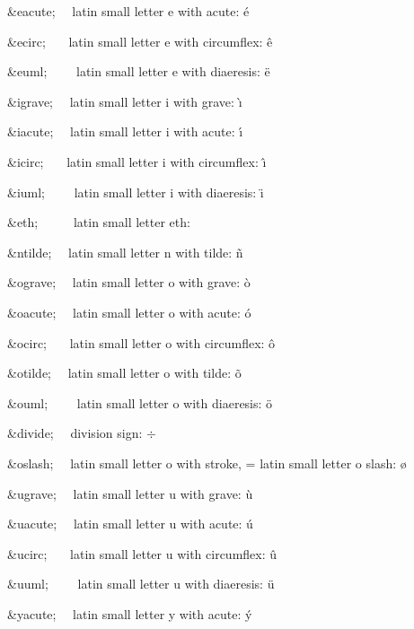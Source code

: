 \begin{DoxyItemize}
\item {\ttfamily \&eacute;}{\ttfamily ~~} latin small letter e with acute\+: \'{e} 
\item {\ttfamily \&ecirc;}{\ttfamily ~~~} latin small letter e with circumflex\+: \^{e} 
\item {\ttfamily \&euml;}{\ttfamily ~~~~} latin small letter e with diaeresis\+: \"{e} 
\item {\ttfamily \&igrave;}{\ttfamily ~~} latin small letter i with grave\+: \`{\i} 
\item {\ttfamily \&iacute;}{\ttfamily ~~} latin small letter i with acute\+: \'{\i} 
\item {\ttfamily \&icirc;}{\ttfamily ~~~} latin small letter i with circumflex\+: \^{\i} 
\item {\ttfamily \&iuml;}{\ttfamily ~~~~} latin small letter i with diaeresis\+: \"{\i} 
\item {\ttfamily \&eth;}{\ttfamily ~~~~~} latin small letter eth\+: \dh 
\item {\ttfamily \&ntilde;}{\ttfamily ~~} latin small letter n with tilde\+: \~{n} 
\item {\ttfamily \&ograve;}{\ttfamily ~~} latin small letter o with grave\+: \`{o} 
\item {\ttfamily \&oacute;}{\ttfamily ~~} latin small letter o with acute\+: \'{o} 
\item {\ttfamily \&ocirc;}{\ttfamily ~~~} latin small letter o with circumflex\+: \^{o} 
\item {\ttfamily \&otilde;}{\ttfamily ~~} latin small letter o with tilde\+: \~{o} 
\item {\ttfamily \&ouml;}{\ttfamily ~~~~} latin small letter o with diaeresis\+: \"{o} 
\item {\ttfamily \&divide;}{\ttfamily ~~} division sign\+: {$\div$} 
\item {\ttfamily \&oslash;}{\ttfamily ~~} latin small letter o with stroke, = latin small letter o slash\+: {\o} 
\item {\ttfamily \&ugrave;}{\ttfamily ~~} latin small letter u with grave\+: \`{u} 
\item {\ttfamily \&uacute;}{\ttfamily ~~} latin small letter u with acute\+: \'{u} 
\item {\ttfamily \&ucirc;}{\ttfamily ~~~} latin small letter u with circumflex\+: \^{u} 
\item {\ttfamily \&uuml;}{\ttfamily ~~~~} latin small letter u with diaeresis\+: \"{u} 
\item {\ttfamily \&yacute;}{\ttfamily ~~} latin small letter y with acute\+: \'{y} 

\end{DoxyItemize}
